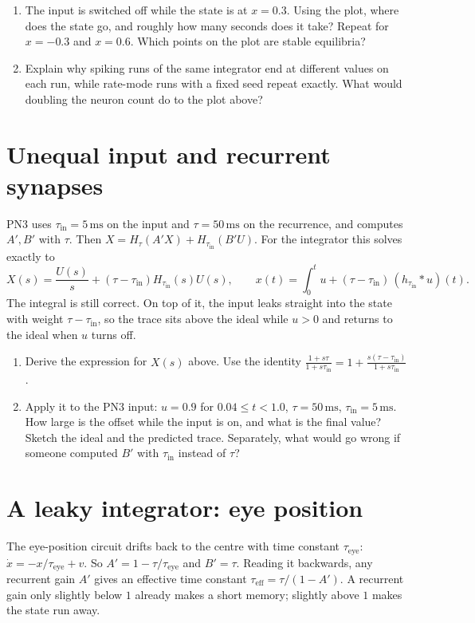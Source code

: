\documentclass[11pt,letterpaper]{article}
\newcommand{\tin}{\tau_{\mathrm{in}}}
\begin{document}
\begin{enumerate}
\item The input is switched off while the state is at $x = 0.3$. Using the plot, where does the state go, and roughly how many seconds does it take? Repeat for $x = -0.3$ and $x = 0.6$. Which points on the plot are stable equilibria?
\item Explain why spiking runs of the same integrator end at different values on each run, while rate-mode runs with a fixed seed repeat exactly. What would doubling the neuron count do to the plot above?
\end{enumerate}

\section{Unequal input and recurrent synapses}

\begin{idea}
PN3 uses $\tin = 5\,\mathrm{ms}$ on the input and $\tau = 50\,\mathrm{ms}$ on the recurrence, and computes $A', B'$ with $\tau$. Then $X = H_\tau(A'X) + H_{\tin}(B'U)$. For the integrator this solves exactly to
\[
X(s) = \frac{U(s)}{s} + (\tau - \tin)H_{\tin}(s)U(s), \qquad x(t) = \int_0^t u + (\tau - \tin)\,(h_{\tin} * u)(t).
\]
The integral is still correct. On top of it, the input leaks straight into the state with weight $\tau - \tin$, so the trace sits above the ideal while $u > 0$ and returns to the ideal when $u$ turns off.
\end{idea}

\begin{enumerate}
\item Derive the expression for $X(s)$ above. Use the identity $\frac{1 + s\tau}{1 + s\tin} = 1 + \frac{s(\tau - \tin)}{1 + s\tin}$.
\item Apply it to the PN3 input: $u = 0.9$ for $0.04 \le t < 1.0$, $\tau = 50\,\mathrm{ms}$, $\tin = 5\,\mathrm{ms}$. How large is the offset while the input is on, and what is the final value? Sketch the ideal and the predicted trace. Separately, what would go wrong if someone computed $B'$ with $\tin$ instead of $\tau$?
\end{enumerate}

\section{A leaky integrator: eye position}

\begin{idea}
The eye-position circuit drifts back to the centre with time constant $\tau_{\mathrm{eye}}$: $\dot x = -x/\tau_{\mathrm{eye}} + v$. So $A' = 1 - \tau/\tau_{\mathrm{eye}}$ and $B' = \tau$. Reading it backwards, any recurrent gain $A'$ gives an effective time constant $\tau_{\mathrm{eff}} = \tau/(1 - A')$. A recurrent gain only slightly below $1$ already makes a short memory; slightly above $1$ makes the state run away.
\end{idea}
\end{document}
